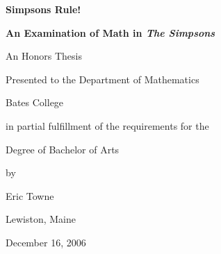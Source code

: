 

\vspace*{4cm} 

\centerline{\LARGE \textbf{Simpsons Rule!}}
\centerline{\LARGE \textbf{An Examination of Math in \emph{The Simpsons}}}
\bigskip\bigskip
\centerline{\Large  An Honors Thesis}
\medskip
\centerline{\Large Presented to the Department of Mathematics}
\medskip
\centerline{\Large Bates College}
\medskip
\centerline{\Large in partial fulfillment of the requirements for the}
\medskip
\centerline{\Large Degree of Bachelor of Arts}
\medskip
\centerline{\Large by}
\medskip
\centerline{\Large Eric Towne}
\medskip
\centerline{\Large Lewiston, Maine}
\medskip
\centerline{\Large December 16, 2006}

\newpage

